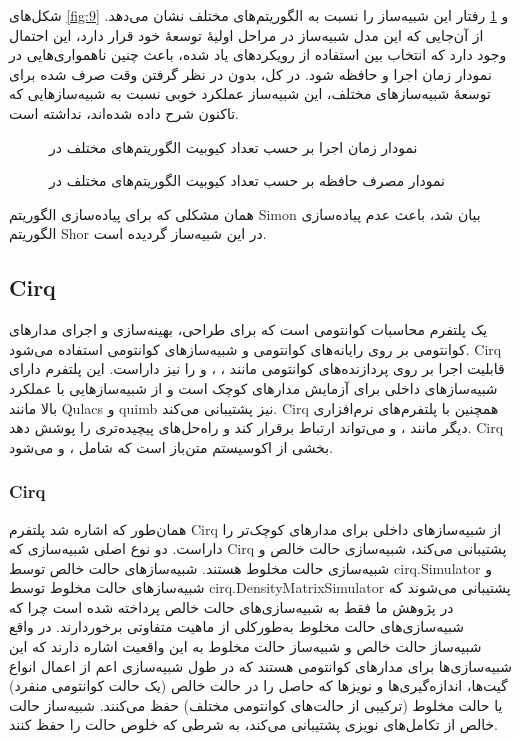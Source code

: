  شکل‌های \ref{fig:9} و \ref{fig:10} رفتار این شبیه‌ساز را نسبت به الگوریتم‌های مختلف نشان می‌دهد. از آن‌جایی که این مدل شبیه‌ساز در مراحل اولیهٔ توسعهٔ خود قرار دارد، این احتمال وجود دارد که انتخاب بین استفاده از رویکردهای یاد شده، باعث چنین ناهمواری‌هایی در نمودار زمان اجرا و حافظه شود. در کل، بدون در نظر گرفتن وقت صرف شده برای توسعهٔ شبیه‌سازهای مختلف، این شبیه‌ساز عملکرد خوبی نسبت به شبیه‌سازهایی که تاکنون شرح داده شده‌اند، نداشته است.

\begin{figure}
	\centering
	\captionsetup{justification=centering}
	
	\caption{
		نمودار زمان اجرا بر حسب تعداد کیوبیت الگوریتم‌های مختلف در
	}
	\label{fig:9}
	\vspace{2cm}
	\captionsetup{justification=centering}
	
	\caption{
		نمودار مصرف حافظه بر حسب تعداد کیوبیت الگوریتم‌های مختلف در
	}
	\label{fig:10}
\end{figure}

همان مشکلی که برای پیاده‌سازی الگوریتم Simon بیان شد، باعث عدم پیاده‌سازی الگوریتم Shor در این شبیه‌ساز گردیده است.

\subsection{Cirq}
یک پلتفرم محاسبات کوانتومی است که برای طراحی، بهینه‌سازی و اجرای مدارهای کوانتومی بر روی رایانه‌های کوانتومی و شبیه‌سازهای کوانتومی استفاده می‌شود. Cirq قابلیت اجرا بر روی پردازنده‌های کوانتومی مانند
، ،  و 
را نیز داراست. این پلتفرم دارای شبیه‌سازهای داخلی برای آزمایش مدارهای کوچک است و از شبیه‌سازهایی با عملکرد بالا مانند Qulacs و quimb نیز پشتیبانی می‌کند. Cirq همچنین با پلتفرم‌های نرم‌افزاری دیگر مانند
،  و 
می‌تواند ارتباط برقرار کند و راه‌حل‌های پیچیده‌تری را پوشش دهد. Cirq بخشی از اکوسیستم متن‌باز
 است که شامل
، 
و
می‌شود.
\subsubsection{Cirq}
همان‌طور که اشاره شد پلتفرم Cirq از شبیه‌سازهای داخلی برای مدارهای کوچک‌تر را داراست. دو نوع اصلی شبیه‌سازی که Cirq پشتیبانی می‌کند، شبیه‌سازی حالت خالص و شبیه‌سازی حالت مخلوط هستند. شبیه‌سازهای حالت خالص توسط cirq.Simulator و شبیه‌سازهای حالت مخلوط توسط cirq.DensityMatrixSimulator پشتیبانی می‌شوند که در پژوهش ما فقط به شبیه‌سازی‌های حالت خالص پرداخته شده است چرا که شبیه‌سازی‌های حالت مخلوط به‌طورکلی از ماهیت متفاوتی برخوردارند. در واقع شبیه‌ساز حالت خالص و شبیه‌ساز حالت مخلوط به این واقعیت اشاره دارند که این شبیه‌سازی‌ها برای مدارهای کوانتومی هستند که در طول شبیه‌سازی اعم از اعمال انواع گیت‌ها، اندازه‌گیری‌ها و نویزها که حاصل را در حالت خالص (یک حالت کوانتومی منفرد) یا حالت مخلوط (ترکیبی از حالت‌های کوانتومی مختلف) حفظ می‌کنند. شبیه‌ساز حالت خالص از تکامل‌های نویزی پشتیبانی می‌کند، به شرطی که خلوص حالت را حفظ کنند.

